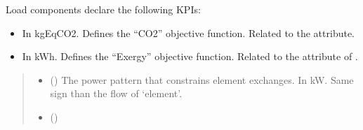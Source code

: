 \documentclass[letterpaper,10pt,english]{sphinxmanual}
\begin{document}
\begin{fulllineitems}
\begin{fulllineitems}
\begin{itemize}
\end{itemize}

\sphinxAtStartPar
Load components declare the following KPIs:
\begin{itemize}
\item {} \begin{description}
\sphinxAtStartPar
In kgEqCO2.
Defines the “CO2” objective function. Related to the  attribute.

\end{description}

\item {} \begin{description}
\sphinxAtStartPar
In kWh.
Defines the “Exergy” objective function. Related to the  attribute of .

\end{description}

\end{itemize}
\begin{quote}\begin{description}
\begin{itemize}
\item {} 
\sphinxAtStartPar
{} (\sphinxstyleliteralemphasis{\sphinxupquote{, }}) \textendash{} The power pattern that constrains element exchanges.
In kW.
Same sign than the flow of ‘element’.

\item {} 
\sphinxAtStartPar
{} ({\hyperref[\detokenize{generated/tamos.element.ElectricityVector:tamos.element.ElectricityVector}]{}}) \textendash{} 


\end{itemize}
\end{description}
\end{quote}
\end{fulllineitems}
\end{fulllineitems}
\end{document}
